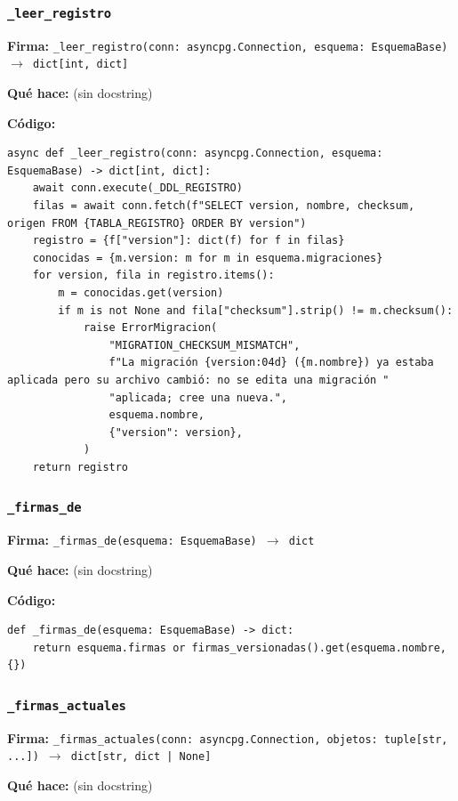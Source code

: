 \documentclass[11pt,a4paper]{article}
\begin{document}
\subsubsection*{\texttt{\_leer\_registro}}
\textbf{Firma:} \texttt{\_leer\_registro(conn: asyncpg.Connection, esquema: EsquemaBase) $\rightarrow$ dict[int, dict]}

\textbf{Qué hace:} (sin docstring)

\textbf{Código:}
\begin{lstlisting}
async def _leer_registro(conn: asyncpg.Connection, esquema: EsquemaBase) -> dict[int, dict]:
    await conn.execute(_DDL_REGISTRO)
    filas = await conn.fetch(f"SELECT version, nombre, checksum, origen FROM {TABLA_REGISTRO} ORDER BY version")
    registro = {f["version"]: dict(f) for f in filas}
    conocidas = {m.version: m for m in esquema.migraciones}
    for version, fila in registro.items():
        m = conocidas.get(version)
        if m is not None and fila["checksum"].strip() != m.checksum():
            raise ErrorMigracion(
                "MIGRATION_CHECKSUM_MISMATCH",
                f"La migración {version:04d} ({m.nombre}) ya estaba aplicada pero su archivo cambió: no se edita una migración "
                "aplicada; cree una nueva.",
                esquema.nombre,
                {"version": version},
            )
    return registro
\end{lstlisting}

\subsubsection*{\texttt{\_firmas\_de}}
\textbf{Firma:} \texttt{\_firmas\_de(esquema: EsquemaBase) $\rightarrow$ dict}

\textbf{Qué hace:} (sin docstring)

\textbf{Código:}
\begin{lstlisting}
def _firmas_de(esquema: EsquemaBase) -> dict:
    return esquema.firmas or firmas_versionadas().get(esquema.nombre, {})
\end{lstlisting}

\subsubsection*{\texttt{\_firmas\_actuales}}
\textbf{Firma:} \texttt{\_firmas\_actuales(conn: asyncpg.Connection, objetos: tuple[str, ...]) $\rightarrow$ dict[str, dict | None]}

\textbf{Qué hace:} (sin docstring)
\end{document}
